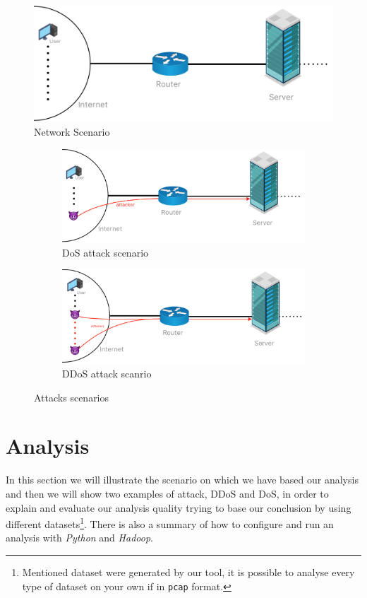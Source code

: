 \begin{figure}[ht]
  \includegraphics[scale=0.31]{imgs/scenario.png}
  \caption{Network Scenario}
  \label{fig:networkscenario}
\end{figure}

\begin{figure}[h]
	\begin{subfigure}{0.48\textwidth}
		\includegraphics[width=\textwidth]{imgs/DoS_attack.png}
		\caption{DoS attack scenario} \label{fig:DoS}
	\end{subfigure}
	\hspace*{\fill} %
	\begin{subfigure}{0.48\textwidth}
		\includegraphics[width=\textwidth]{imgs/DDoS_attack.png}
		\caption{DDoS attack scanrio} \label{fig:DDoS}
	\end{subfigure}
	\caption{Attacks scenarios}
	\label{fig:atks}
\end{figure}

\section{Analysis}
In this section we will illustrate the scenario on which we have based our analysis and then we will show two examples of attack, DDoS and DoS, in order to explain and evaluate our analysis quality trying to base our conclusion by using different datasets\footnote{Mentioned dataset were generated by our tool, it is possible to analyse every type of dataset on your own if in \texttt{pcap} format.}. There is also a summary of how to configure and run an analysis with \textit{Python} and \textit{Hadoop}.

